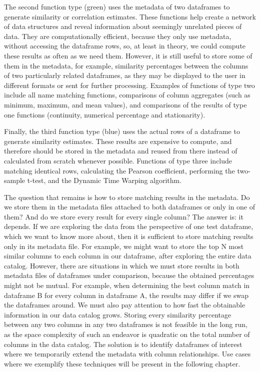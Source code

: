 The second function type (green) uses the metadata of two dataframes to generate similarity or correlation estimates.
These functions help create a network of data structures and reveal information about seemingly unrelated pieces of data.
They are computationally efficient, because they only use metadata, without accessing the dataframe rows, so, at least
in theory, we could compute these results as often as we need them.
However, it is still useful to store some of them in the metadata, for example, similarity percentages between the columns
of two particularly related dataframes, as they may be displayed to the user in different formats or sent for further processing.
Examples of functions of type two include all name matching functions, comparisons of column aggregates (such as minimum, maximum,
and mean values), and comparisons of the results of type one functions (continuity, numerical percentage and stationarity).

Finally, the third function type (blue) uses the actual rows of a dataframe to generate similarity estimates.
These results are expensive to compute, and therefore should be stored in the metadata and reused from there instead of
calculated from scratch whenever possible.
Functions of type three include matching identical rows, calculating the Pearson coefficient, performing the two-sample t-test,
and the Dynamic Time Warping algorithm.

The question that remains is how to store matching results in the metadata.
Do we store them in the metadata files attached to both dataframes or only in one of them?
And do we store every result for every single column?
The answer is: it depends.
If we are exploring the data from the perspective of one test dataframe, which we want to know more about, then it is
sufficient to store matching results only in its metadata file.
For example, we might want to store the top N most similar columns to each column in our dataframe, after exploring the entire
data catalog.
However, there are situations in which we must store results in both metadata files of dataframes under comparison, because
the obtained percentages might not be mutual.
For example, when determining the best column match in dataframe B for every column in dataframe A, the results may differ
if we swap the dataframes around.
We must also pay attention to how fast the obtainable information in our data catalog grows.
Storing every similarity percentage between any two columns in any two dataframes is not feasible in the long run, as the
space complexity of such an endeavor is quadratic on the total number of columns in the data catalog.
The solution is to identify dataframes of interest where we temporarily extend the metadata with column relationships.
Use cases where we exemplify these techniques will be present in the following chapter.


